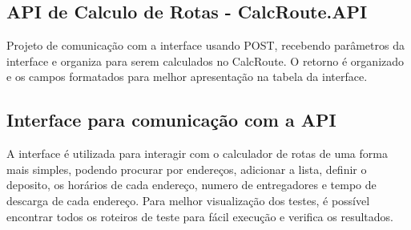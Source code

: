 \begin{center}
	\label{fig:DataGenerate}
\end{center}

\subsection{API de Calculo de Rotas - CalcRoute.API}

Projeto de comunicação com a interface usando POST, recebendo parâmetros da interface e organiza para serem calculados no CalcRoute. 
O retorno é organizado e os campos formatados para melhor apresentação na tabela da interface.

\subsection{Interface para comunicação com a API}

A interface é utilizada para interagir com o calculador de rotas de uma forma mais simples, podendo procurar por endereços, adicionar a lista, definir o deposito, os horários de cada endereço, numero de entregadores e tempo de descarga de cada endereço. Para melhor visualização dos testes, é possível encontrar todos os roteiros de teste para fácil execução e verifica os resultados.

\begin{center}
	\label{fig:Interface}
\end{center}

